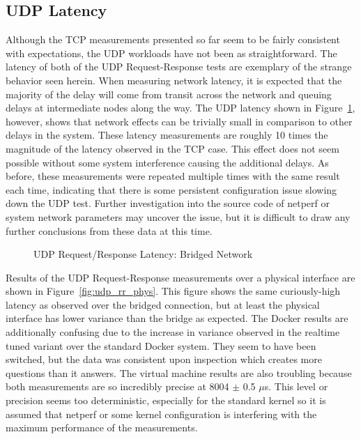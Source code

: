\subsection{UDP Latency} %
\label{sub:udplatency}
Although the TCP measurements presented so far seem to be fairly consistent with expectations, the UDP workloads have not been as straightforward.
The latency of both of the UDP Request-Response tests are exemplary of the strange behavior seen herein.
When measuring network latency, it is expected that the majority of the delay will come from transit across the network and queuing delays at intermediate nodes along the way.  
The UDP latency shown in Figure~\ref{fig:udp_rr_bridge}, however, shows that network effects can be trivially small in comparison to other delays in the system.
These latency measurements are roughly 10 times the magnitude of the latency observed in the TCP case.
This effect does not seem possible without some system interference causing the additional delays.  
As before, these measurements were repeated multiple times with the same result each time, indicating that there is some persistent configuration issue slowing down the UDP test.
Further investigation into the source code of netperf or system network parameters may uncover the issue, but it is difficult to draw any further conclusions from these data at this time.

\begin{figure}
    \centering
    \def\svgwidth{\columnwidth}
    
    \caption{UDP Request/Response Latency: Bridged Network}
    \label{fig:udp_rr_bridge}
\end{figure}
Results of the UDP Request-Response measurements over a physical interface are shown in Figure~\ref{fig:udp_rr_phys}.  
This figure shows the same curiously-high latency as observed over the bridged connection, but at least the physical interface has lower variance than the bridge as expected.
The Docker results are additionally confusing due to the increase in variance observed in the realtime tuned variant over the standard Docker system.
They seem to have been switched, but the data was consistent upon inspection which creates more questions than it answers.
The virtual machine results are also troubling because both measurements are so incredibly precise at 8004 $\pm$ 0.5 $\mu$s.  
This level or precision seems too deterministic, especially for the standard kernel so it is assumed that netperf or some kernel configuration is interfering with the maximum performance of the measurements.

